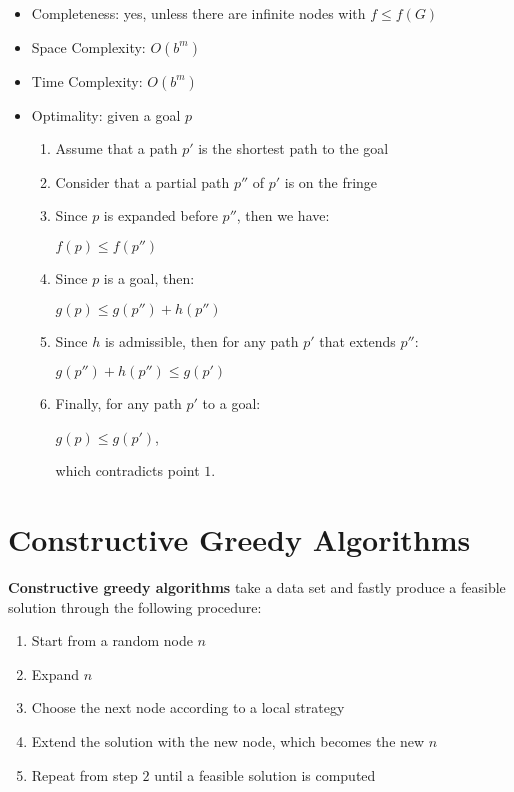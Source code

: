 \documentclass{article}
\begin{document}
\begin{itemize}
    \item Completeness: yes, unless there are infinite nodes with $f \leq f(G)$
    \item Space Complexity: $O(b^m)$
    \item Time Complexity: $O(b^m)$
    \item Optimality: given a goal $p$
        \begin{enumerate}
            \item Assume that a path $p'$ is the shortest path to the goal
            \item Consider that a partial path $p''$ of $p'$ is on the fringe
            \item Since $p$ is expanded before $p''$, then we have:
                \begin{center}
                    $f(p) \leq f(p'')$
                \end{center}
            \item Since $p$ is a goal, then:
                \begin{center}
                    $g(p) \leq g(p'') + h(p'') $
                \end{center}
            \item Since $h$ is admissible, then for any path $p'$ that extends $p''$:
                \begin{center}
                    $g(p'') + h(p'') \leq g(p')$
                \end{center}
            \item Finally, for any path $p'$ to a goal:
                \begin{center}
                    $g(p) \leq g(p')$,
                \end{center}
                which contradicts point $1$.
        \end{enumerate}
\end{itemize}

\newpage

\section{Constructive Greedy Algorithms}
\textbf{Constructive greedy algorithms} take a data set and fastly produce a feasible solution through the following procedure:
\begin{enumerate}
    \item Start from a random node $n$
    \item Expand $n$
    \item Choose the next node according to a local strategy
    \item Extend the solution with the new node, which becomes the new $n$
    \item Repeat from step $2$ until a feasible solution is computed
\end{enumerate}
\end{document}
